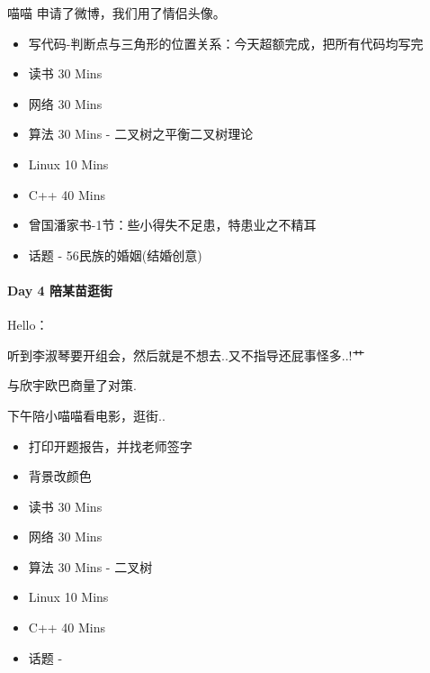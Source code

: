 \documentclass[UTF8,a4paper,8pt]{ctexart}
\begin{document}
		 喵喵 申请了微博，我们用了情侣头像。
		 \begin{itemize}
		 	\item  \makebox[0pt][l]{$\square$}\raisebox{.15ex}{\hspace{0.1em}$\checkmark$}写代码-判断点与三角形的位置关系：今天超额完成，把所有代码均写完
		 	
		 	\item  \makebox[0pt][l]{$\square$}\raisebox{.15ex}{\hspace{0.1em}$\checkmark$}读书  30 Mins
		 	\item  网络  30 Mins		 	
		 	\item  \makebox[0pt][l]{$\square$}\raisebox{.15ex}{\hspace{0.1em}$\checkmark$}算法  30 Mins	- 二叉树之平衡二叉树理论
		 	\item  \makebox[0pt][l]{$\square$}\raisebox{.15ex}{\hspace{0.1em}$\checkmark$}Linux 10 Mins
		 	\item  C++   40 Mins
		 	
		 	\item  \makebox[0pt][l]{$\square$}\raisebox{.15ex}{\hspace{0.1em}$\checkmark$}曾国潘家书-1节：些小得失不足患，特患业之不精耳
		 	\item  \makebox[0pt][l]{$\square$}\raisebox{.15ex}{\hspace{0.1em}$\checkmark$}话题 - 56民族的婚姻(结婚创意)
		 \end{itemize}
	 \paragraph{Day 4   陪某苗逛街   \quad     }Hello：
	 
		 听到李淑琴要开组会，然后就是不想去..又不指导还屁事怪多..!艹
		 
		 与欣宇欧巴商量了对策.
		 
		 下午陪小喵喵看电影，逛街..
		 
		 \begin{itemize}
		 	\item  \makebox[0pt][l]{$\square$}\raisebox{.15ex}{\hspace{0.1em}$\checkmark$}打印开题报告，并找老师签字
		 	\item  \makebox[0pt][l]{$\square$}\raisebox{.15ex}{\hspace{0.1em}$\checkmark$}背景改颜色
		 	
		 	\item  \makebox[0pt][l]{$\square$}\raisebox{.15ex}{\hspace{0.1em}$\checkmark$}读书  30 Mins
		 	\item  网络  30 Mins		 	
		 	\item  算法  30 Mins	- 二叉树
		 	\item  \makebox[0pt][l]{$\square$}\raisebox{.15ex}{\hspace{0.1em}$\checkmark$}Linux 10 Mins
		 	\item  C++   40 Mins
		 	
		 	\item  话题 - 
		 \end{itemize}
\end{document}

